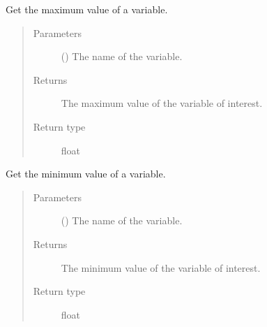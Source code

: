 \documentclass[letterpaper,10pt,english]{sphinxmanual}
\begin{document}
\begin{fulllineitems}
\begin{fulllineitems}
\begin{quote}
\begin{description}
\end{description}\end{quote}

\end{fulllineitems}


\begin{fulllineitems}
\label{\detokenize{api:tasmania.storages.grid_data.GridData.get_max}}
Get the maximum value of a variable.
\begin{quote}\begin{description}
\item[{Parameters}] \leavevmode
{} () \textendash{} The name of the variable.

\item[{Returns}] \leavevmode
The maximum value of the variable of interest.

\item[{Return type}] \leavevmode
float

\end{description}\end{quote}

\end{fulllineitems}


\begin{fulllineitems}
\label{\detokenize{api:tasmania.storages.grid_data.GridData.get_min}}
Get the minimum value of a variable.
\begin{quote}\begin{description}
\item[{Parameters}] \leavevmode
{} () \textendash{} The name of the variable.

\item[{Returns}] \leavevmode
The minimum value of the variable of interest.

\item[{Return type}] \leavevmode
float

\end{description}\end{quote}

\end{fulllineitems}


\end{fulllineitems}
\end{document}
